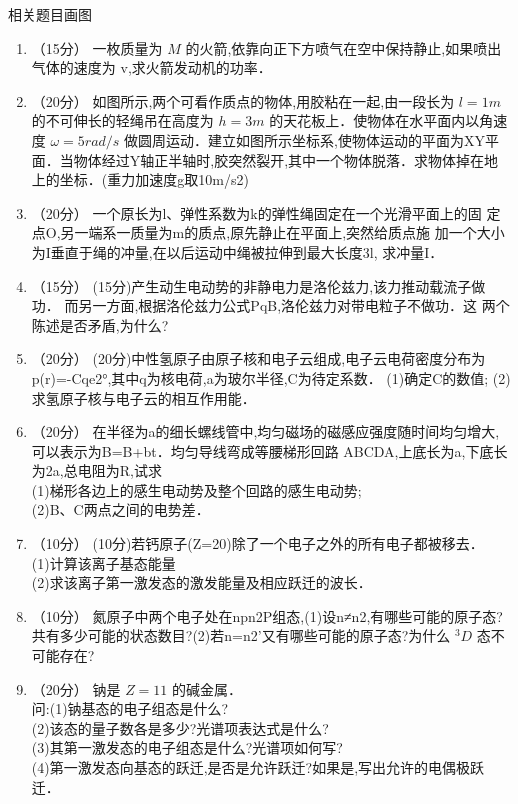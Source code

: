 
\begin{issues}
\issueTODO
相关题目画图
\end{issues}


\begin{enumerate}
\item （15分）
一枚质量为 $M$ 的火箭,依靠向正下方喷气在空中保持静止,如果喷出气体的速度为 $\mathrm v$,求火箭发动机的功率．
\item （20分）
如图所示,两个可看作质点的物体,用胶粘在一起,由一段长为 $l=1m$ 的不可伸长的轻绳吊在高度为 $h=3m$ 的天花板上．使物体在水平面内以角速度 $\omega=5rad/s$ 做圆周运动．建立如图所示坐标系,使物体运动的平面为XY平面．当物体经过Y轴正半轴时,胶突然裂开,其中一个物体脱落．求物体掉在地上的坐标．(重力加速度g取10m/s2)
\item （20分）
一个原长为l、弹性系数为k的弹性绳固定在一个光滑平面上的固
定点O,另一端系一质量为m的质点,原先静止在平面上,突然给质点施
加一个大小为I垂直于绳的冲量,在以后运动中绳被拉伸到最大长度3l,
求冲量I．
\item （15分）
(15分)产生动生电动势的非静电力是洛伦兹力,该力推动载流子做功．
而另一方面,根据洛伦兹力公式PqB,洛伦兹力对带电粒子不做功．这
两个陈述是否矛盾,为什么?
\item （20分）
(20分)中性氢原子由原子核和电子云组成,电子云电荷密度分布为
p(r)=-Cqe2°,其中q为核电荷,a为玻尔半径,C为待定系数．
(1)确定C的数值;
(2)求氢原子核与电子云的相互作用能．
\item （20分）
在半径为a的细长螺线管中,均匀磁场的磁感应强度随时间均匀增大,可以表示为B=B+bt．均匀导线弯成等腰梯形回路 ABCDA,上底长为a,下底长为2a,总电阻为R,试求\\
(1)梯形各边上的感生电动势及整个回路的感生电动势;\\
(2)B、C两点之间的电势差．
\item （10分）
(10分)若钙原子(Z=20)除了一个电子之外的所有电子都被移去．\\
(1)计算该离子基态能量\\
(2)求该离子第一激发态的激发能量及相应跃迁的波长．
\item （10分）
氮原子中两个电子处在npn2P组态,(1)设n≠n2,有哪些可能的原子态?共有多少可能的状态数目?(2)若n=n2’又有哪些可能的原子态?为什么 $^{3}D$ 态不可能存在?
\item （20分） 
钠是 $Z=11$ 的碱金属．\\问:(1)钠基态的电子组态是什么?\\(2)该态的量子数各是多少?光谱项表达式是什么?\\(3)其第一激发态的电子组态是什么?光谱项如何写?\\(4)第一激发态向基态的跃迁,是否是允许跃迁?如果是,写出允许的电偶极跃迁．
\end{enumerate}